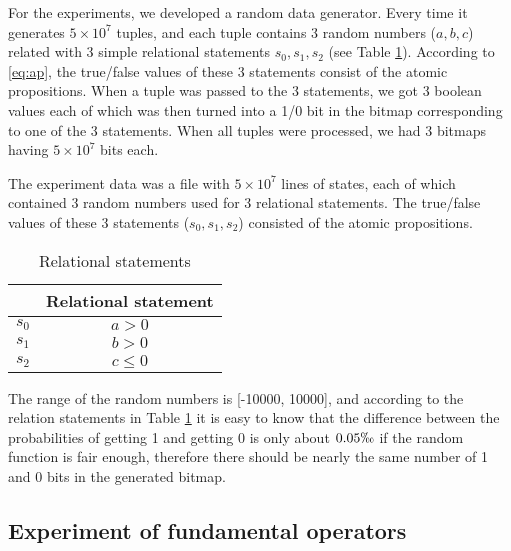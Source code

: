 For the experiments, we developed a random data generator. Every time it generates $5 \times 10^7$ tuples, and each tuple contains 3 random numbers ($a, b, c$) related with 3 simple relational statements $s_0, s_1, s_2$  (see Table \ref{tbl:statements}). According to \eqref{eq:ap}, the true/false values of these 3 statements consist of the atomic propositions. When a tuple was passed to the 3 statements, we got 3 boolean values each of which was then turned into a 1/0 bit in the bitmap corresponding to one of the 3 statements. When all tuples were processed, we had 3 bitmaps having $5 \times 10^7$ bits each.

The experiment data was a file with $5 \times 10^7$ lines of states, each of which contained 3 random numbers used for 3 relational statements. The true/false values of these 3 statements ($s_0, s_1, s_2$) consisted of the atomic propositions.



\begin{table}[h]
\centering
\begin{tabular}{|c|c|}
\hline
& Relational statement \\
\hline
$s_0$ & $a > 0$ \\
\hline
$s_1$ & $b > 0$ \\
\hline
$s_2$ & $c \leq 0$ \\
\hline
\end{tabular}
\caption{Relational statements}
\label{tbl:statements}
\end{table}

The range of the random numbers is [-10000, 10000], and according to the relation statements in Table \ref{tbl:statements} it is easy to know that the difference between the probabilities of getting 1 and getting 0 is only about $0.05\permil$ if the random function is fair enough, therefore there should be nearly the same number of 1 and 0 bits in the generated bitmap.


\subsection{Experiment of fundamental operators} %

